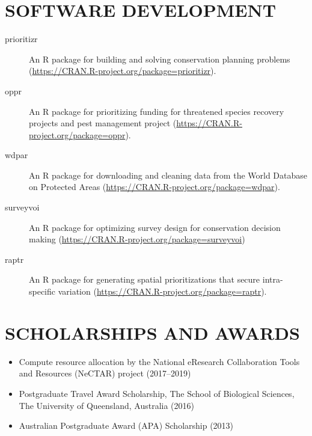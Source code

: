 \documentclass[12pt,a4paper]{article}
\begin{document}
\section*{SOFTWARE DEVELOPMENT}
\begin{description}

\item[prioritizr] An R package for building and solving conservation planning problems (\url{https://CRAN.R-project.org/package=prioritizr}).

\item[oppr] An R package for prioritizing funding for threatened species recovery projects and pest management project (\url{https://CRAN.R-project.org/package=oppr}).

\item[wdpar] An R package for downloading and cleaning data from the World Database on Protected Areas (\url{https://CRAN.R-project.org/package=wdpar}).

\item[surveyvoi] An R package for optimizing survey design for conservation decision making (\url{https://CRAN.R-project.org/package=surveyvoi})

\item[raptr] An R package for generating spatial prioritizations that secure intra-specific variation (\url{https://CRAN.R-project.org/package=raptr}).

\end{description}

\clearpage

\section*{SCHOLARSHIPS AND AWARDS}
\begin{itemize}

\item Compute resource allocation by the National eResearch Collaboration Tools and Resources (NeCTAR) project (2017--2019)

\item Postgraduate Travel Award Scholarship, The School of Biological Sciences, The University of Queensland, Australia (2016)

\item Australian Postgraduate Award (APA) Scholarship (2013)

\end{itemize}
\end{document}
